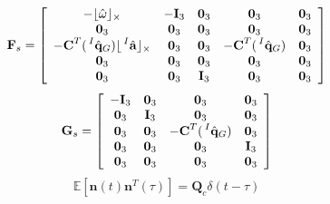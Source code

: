 \documentclass{article}
\begin{document}
\begin{equation}
    \textbf{F}_{s}=\left[\begin{array}{ccccc}
        -\lfloor{\hat{\mathbf{\omega}}}\rfloor_{\times} &-\textbf{I}_{3} &\textbf{0}_{3} &\textbf{0}_{3} &\textbf{0}_{3}\\
        \textbf{0}_{3} &\textbf{0}_{3} &\textbf{0}_{3} &\textbf{0}_{3} &\textbf{0}_{3}\\
        -\textbf{C}^{T}(\sideset{^I}{}{\mathop{\hat{\mathbf{q}}_{G}}})\lfloor{\sideset{^I}{}{\mathop{\hat{\mathbf{a}}}}}\rfloor_{\times}
        &\textbf{0}_{3} &\textbf{0}_{3} &-\textbf{C}^{T}(\sideset{^I}{}{\mathop{\hat{\mathbf{q}}_{G}}}) &\textbf{0}_{3}\\
        \textbf{0}_{3} &\textbf{0}_{3} &\textbf{0}_{3} &\textbf{0}_{3} &\textbf{0}_{3}\\
        \textbf{0}_{3} &\textbf{0}_{3} &\textbf{I}_{3} &\textbf{0}_{3} &\textbf{0}_{3}
    \end{array}\right]
\end{equation}
\begin{equation}
    \textbf{G}_{s}=\left[\begin{array}{cccc}
        -\textbf{I}_{3} &\textbf{0}_{3} &\textbf{0}_{3} &\textbf{0}_{3}\\
        \textbf{0}_{3} &\textbf{I}_{3} &\textbf{0}_{3} &\textbf{0}_{3}\\
        \textbf{0}_{3} &\textbf{0}_{3} &-\textbf{C}^{T}(\sideset{^I}{}{\mathop{\hat{\mathbf{q}}_{G}}}) &\textbf{0}_{3}\\
        \textbf{0}_{3} &\textbf{0}_{3} &\textbf{0}_{3} &\textbf{I}_{3}\\
        \textbf{0}_{3} &\textbf{0}_{3} &\textbf{0}_{3} &\textbf{0}_{3}
    \end{array}\right]
\end{equation}
\begin{equation}
    \mathbb{E}\left[\mathbf{n}(t)\mathbf{n}^{T}(\tau)\right]=\textbf{Q}_{c}\delta(t-\tau)
\end{equation}
\end{document}
